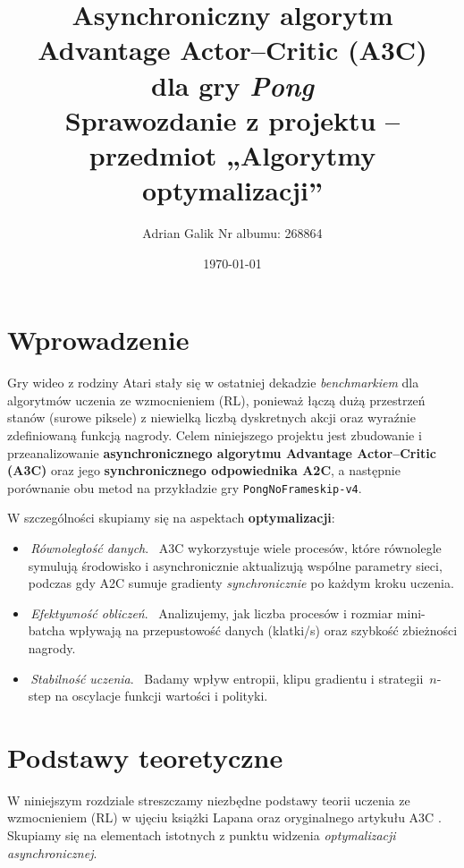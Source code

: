 \documentclass[12pt,a4paper]{article}
\title{\textbf{Asynchroniczny algorytm Advantage Actor–Critic (A3C)\\
dla gry \emph{Pong}}\\
\large{Sprawozdanie z projektu – przedmiot „Algorytmy optymalizacji”}}
\author{Adrian Galik Nr albumu: 268864}
\date{\today}
\begin{document}
\maketitle
\tableofcontents
\clearpage

\section{Wprowadzenie}

Gry wideo z rodziny Atari stały się w ostatniej dekadzie
\emph{bench­markiem} dla algorytmów uczenia ze wzmocnieniem (RL), ponieważ
łączą dużą przestrzeń stanów (surowe piksele) z niewielką liczbą dyskretnych
akcji oraz wyraźnie zdefiniowaną funkcją nagrody.
Celem niniejszego projektu jest zbudowanie i przeanalizowanie
\textbf{asynchronicznego algorytmu Advantage Actor–Critic (A3C)} oraz jego
\textbf{synchronicznego odpowiednika A2C}, a następnie porównanie obu metod
na przykładzie gry \texttt{PongNoFrameskip-v4}.

\bigskip
\noindent
W szczególności skupiamy się na aspektach \textbf{optymalizacji}:

\begin{itemize}
  \item\,\textit{Równoległość danych}. \
        A3C wykorzystuje wiele procesów, które równolegle symulują środowisko
        i asynchronicznie aktualizują wspólne parametry sieci,
        podczas gdy A2C sumuje gradienty \emph{synchronicznie}
        po każdym kroku uczenia.
  \item\,\textit{Efektywność obliczeń}. \
        Analizujemy, jak liczba procesów i rozmiar mini-batcha wpływają na
        przepustowość danych (klatki/s) oraz szybkość zbieżności nagrody.
  \item\,\textit{Stabilność uczenia}. \
        Badamy wpływ entropii, klipu gradientu i strategii~$n$-step
        na oscylacje funkcji wartości i polityki.
\end{itemize}


\section{Podstawy teoretyczne}
\label{sec:teoria}

W niniejszym rozdziale streszczamy niezbędne podstawy teorii uczenia ze wzmocnieniem (RL) w ujęciu książki Lapana \cite{Lapan2018} oraz oryginalnego artykułu A3C \cite{Mnih2016A3C}.
Skupiamy się na elementach istotnych z punktu widzenia
\emph{optymalizacji asynchronicznej}.
\end{document}
